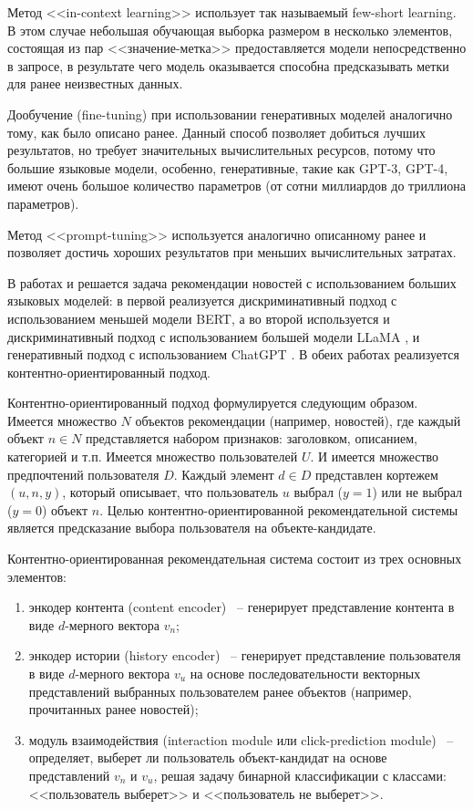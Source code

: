 Метод <<in-context learning>> использует так называемый few-short learning. В этом случае небольшая обучающая выборка размером в несколько элементов, состоящая из пар <<значение-метка>> предоставляется модели непосредственно в запросе, в результате чего модель оказывается способна предсказывать метки для ранее неизвестных данных.

Дообучение (fine-tuning) при использовании генеративных моделей аналогично тому, как было описано ранее. Данный способ позволяет добиться лучших результатов, но требует значительных вычислительных ресурсов, потому что большие языковые модели, особенно, генеративные, такие как GPT-3, GPT-4, имеют очень большое количество параметров (от сотни миллиардов до триллиона параметров).

Метод <<prompt-tuning>> используется аналогично описанному ранее и позволяет достичь хороших результатов при меньших вычислительных затратах.


В работах \cite{news_rec_bert} и \cite{news_rec_gen} решается задача рекомендации новостей с использованием больших языковых моделей: в первой реализуется дискриминативный подход с использованием меньшей модели BERT, а во второй используется и дискриминативный подход с использованием большей модели LLaMA \cite{llama}, и генеративный подход с использованием ChatGPT \cite{chatgpt}. В обеих работах реализуется контентно-ориентированный подход.

Контентно-ориентированный подход формулируется следующим образом. Имеется множество $N$ объектов рекомендации (например, новостей), где каждый объект $n \in N$ представляется набором признаков: заголовком, описанием, категорией и т.п. Имеется множество пользователей $U$. И имеется множество предпочтений пользователя $D$. Каждый элемент $d \in D$ представлен кортежем $(u, n, y)$, который описывает, что пользователь $u$ выбрал ($y = 1$) или не выбрал ($y = 0$) объект $n$. Целью контентно-ориентированной рекомендательной системы является предсказание выбора пользователя на объекте-кандидате.

Контентно-ориентированная рекомендательная система состоит из трех основных элементов:
\begin{enumerate}
    \item энкодер контента (content encoder) ~-- генерирует представление контента в виде $d$-мерного вектора $v_n$;
    \item энкодер истории (history encoder) ~-- генерирует представление пользователя в виде $d$-мерного вектора $v_u$ на основе последовательности векторных представлений выбранных пользователем ранее объектов (например, прочитанных ранее новостей);
    \item модуль взаимодействия (interaction module или click-prediction module) ~-- определяет, выберет ли пользователь объект-кандидат на основе представлений $v_n$ и $v_u$, решая задачу бинарной классификации с классами: <<пользователь выберет>> и <<пользователь не выберет>>.
\end{enumerate}

